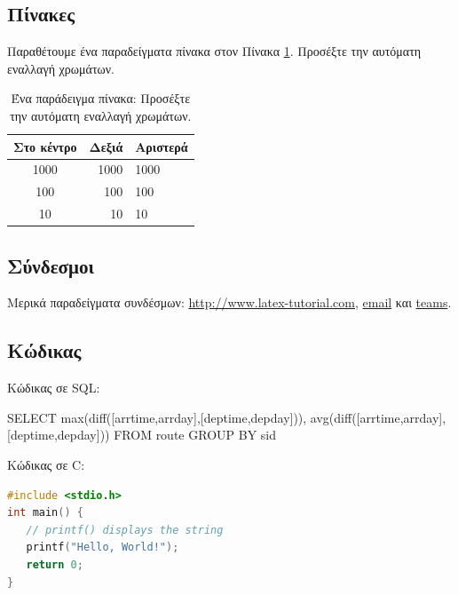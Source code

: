 %
%
\subsection{Πίνακες}

Παραθέτουμε ένα παραδείγματα πίνακα στον Πίνακα \ref{tab:example}. Προσέξτε την αυτόματη εναλλαγή χρωμάτων.

\begin{table}
\centering
{}
\begin{tabular}{|c|r|l|}\hline
\rowcolor{gray}
Στο κέντρο & Δεξιά & Αριστερά \\\hline\hline
    1000 & 1000 & 1000 \\\hline
    100 & 100 & 100 \\ \hline
    10 & 10 & 10 \\ \hline
\end{tabular}
\caption{Ένα παράδειγμα πίνακα: Προσέξτε την αυτόματη εναλλαγή χρωμάτων.}
\label{tab:example}
\end{table}



%
%
\subsection{Σύνδεσμοι}

Μερικά παραδείγματα συνδέσμων: \url{http://www.latex-tutorial.com}, \href{mailto:sss@uop.gr}{email} και \href{https://teams.microsoft.com/}{teams}.


%
%
\subsection{Κώδικας}
Κώδικας σε SQL:
\begin{SQLcode}
SELECT max(diff([arrtime,arrday],[deptime,depday])),
	   avg(diff([arrtime,arrday],[deptime,depday]))
FROM route
GROUP BY sid
\end{SQLcode}


Κώδικας σε C:
\begin{lstlisting}[language=C]
#include <stdio.h>
int main() {
   // printf() displays the string
   printf("Hello, World!");
   return 0;
}
\end{lstlisting}

